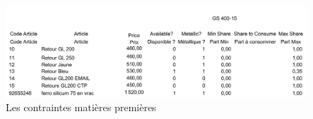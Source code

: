 \documentclass[12pt]{article}
\begin{document}
\begin{figure}[H]
    \centering
    \begin{adjustbox}{width=1.25\textwidth,center}
        \includegraphics[scale=1]{Images/Recette/Contraintes matières premières 1.pdf}
    \end{adjustbox}
    \caption{Les contraintes matières premières}
    \label{fig:contraintes3}
\end{figure}





\end{document}
